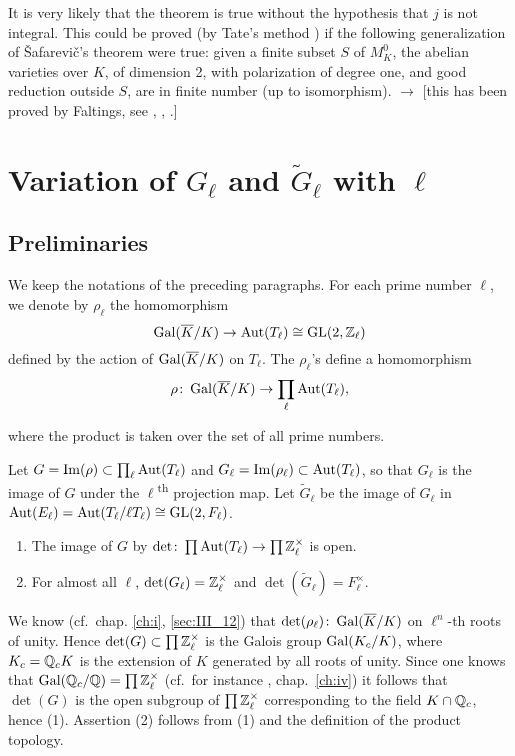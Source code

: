 \begin{obs}
It is very likely that the theorem is true without the hypothesis that $j$ is
not integral. This could be proved (by Tate's method \cite{38}) if the
following generalization of \v Safarevi\v c's theorem were true: given a finite
subset $S$ of $M_K^0$, the abelian varieties over $K$, of dimension 2, with
polarization of degree one, and good reduction outside $S$, are in finite
number (up to isomorphism). $\to$ [this has been proved by Faltings, see
\cite{54}, \cite{56}, \cite{82}.]
\end{obs}

\dpage

\section{Variation of \texorpdfstring{$G_\ell$}{Gℓ} and
\texorpdfstring{$\widetilde{G}_\ell$}{Ḡℓ} with \texorpdfstring{$\ell$}{ℓ}}
\label{sec:IV_3}

\subsection{Preliminaries}
\label{sec:IV_31}

We keep the notations of the preceding paragraphs. For each prime number $\ell$,
we denote by $\rho_{\ell}$ the homomorphism
\[
	\operatorname{Gal}(\overline{K}/K) \rightarrow \operatorname{Aut}(T_\ell) \cong \operatorname{GL}(2, \mathbb{Z}_\ell)
\]
defined by the action of $\operatorname{Gal}(\overline{K}/K)$ on $T_\ell$. The $\rho_\ell$'s
define a homomorphism
\[
	\rho \colon \operatorname{Gal}(\overline{K}/K) \rightarrow \prod_\ell \operatorname{Aut}(T_\ell),
\]

where the product is taken over the set of all prime numbers.

Let $G = \operatorname{Im}(\rho) \subset \prod_\ell \operatorname{Aut}(T_\ell)$ and $G_\ell = \operatorname{Im}(\rho_\ell)
\subset \operatorname{Aut}(T_\ell)$, so that $G_\ell$ is the image of $G$ under the
$\ell$\textsuperscript{th} projection map. Let $\tilde{G}_\ell$ be the image of
$G_\ell$ in $\operatorname{Aut}(E_\ell) = \operatorname{Aut}(T_\ell / \ell T_\ell) \cong \operatorname{GL}(2, F_\ell)$.

\begin{lem}
\begin{enumerate}
	\item The image of $G$ by $\det \colon \prod \operatorname{Aut}(T_\ell) \rightarrow
\prod \mathbb{Z}^\times_\ell$ is open.
	\item For almost all $\ell$, $\det(G_\ell) = \mathbb{Z}^\times_\ell$ and
$\det(\tilde{G}_\ell) = F^\times_\ell$.
\end{enumerate}
\end{lem}
We know (cf.\ chap. \ref{ch:i}, \ref{sec:III_12}) that $\det(\rho_\ell) \colon
\operatorname{Gal}(\overline{K}/K)$ on $\ell^n$-th roots of unity. Hence $\det(G) \subset
\prod \mathbb{Z}_\ell^\times$ is the Galois group $\operatorname{Gal}(K_c / K)$, where $K_c = \mathbb{Q}_cK$
is the extension of $K$ generated by all roots of unity. Since one knows that
$\operatorname{Gal}(\mathbb{Q}_c / \mathbb{Q}) = \prod \mathbb{Z}^\times_\ell$ (cf.\ for instance \cite{13}, chap.\
\ref{ch:iv}) it follows that $\det(G)$ is the open subgroup of $\prod
\mathbb{Z}^\times_\ell$ corresponding to the field $K \cap \mathbb{Q}_c$, hence (1). Assertion
(2) follows
\dpage
from (1) and the definition of the product topology.


